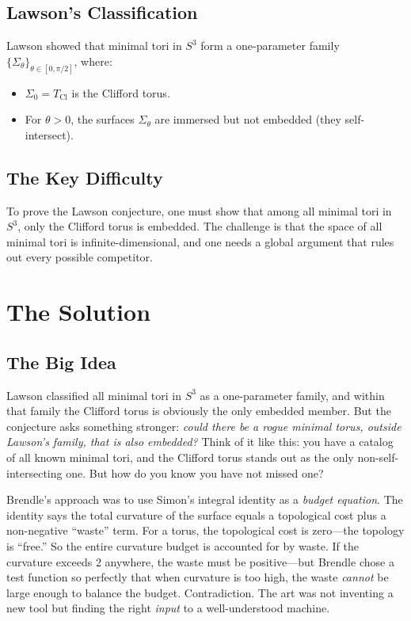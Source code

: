 \subsection{Lawson's Classification}
Lawson showed that minimal tori in $S^3$ form a one-parameter family $\{\Sigma_\theta\}_{\theta \in [0, \pi/2]}$, where:
\begin{itemize}
\item $\Sigma_0 = T_{\text{Cl}}$ is the Clifford torus.
\item For $\theta > 0$, the surfaces $\Sigma_\theta$ are immersed but not embedded (they self-intersect).
\end{itemize}

\subsection{The Key Difficulty}
To prove the Lawson conjecture, one must show that among all minimal tori in $S^3$, only the Clifford torus is embedded. The challenge is that the space of all minimal tori is infinite-dimensional, and one needs a global argument that rules out every possible competitor.

\section{The Solution}

\subsection{The Big Idea}

Lawson classified all minimal tori in $S^3$ as a one-parameter family, and within that family the Clifford torus is obviously the only embedded member. But the conjecture asks something stronger: \emph{could there be a rogue minimal torus, outside Lawson's family, that is also embedded?} Think of it like this: you have a catalog of all known minimal tori, and the Clifford torus stands out as the only non-self-intersecting one. But how do you know you have not missed one?

Brendle's approach was to use Simon's integral identity as a \emph{budget equation}. The identity says the total curvature of the surface equals a topological cost plus a non-negative ``waste'' term. For a torus, the topological cost is zero---the topology is ``free.'' So the entire curvature budget is accounted for by waste. If the curvature exceeds 2 anywhere, the waste must be positive---but Brendle chose a test function so perfectly that when curvature is too high, the waste \emph{cannot} be large enough to balance the budget. Contradiction. The art was not inventing a new tool but finding the right \emph{input} to a well-understood machine.

